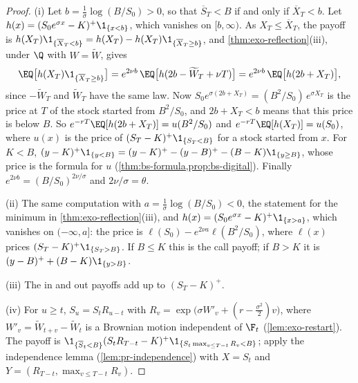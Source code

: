 \begin{proof}
(i) Let $b=\frac1\sigma\log(B/S_0)>0$, so that $\overline S_T<B$ if and only if
$\overline X_T<b$. Let $h(x)=(S_0e^{\sigma x}-K)^+\1_{\{x<b\}}$, which vanishes on $[b,\infty)$. As
$X_T\le\overline X_T$, the payoff is $h(X_T)\1_{\{\overline X_T<b\}}=h(X_T)-h(X_T)\1_{\{\overline X_T\ge b\}}$,
and \cref{thm:exo-reflection}(iii), under $\Q$ with $W=\widetilde W$, gives
\[
  \EQ\big[h(X_T)\1_{\{\overline X_T\ge b\}}\big]=e^{2\nu b}\,\EQ\big[h(2b-\widetilde W_T+\nu T)\big]
  =e^{2\nu b}\,\EQ\big[h(2b+X_T)\big],
\]
since $-\widetilde W_T$ and $\widetilde W_T$ have the same law. Now
$S_0e^{\sigma(2b+X_T)}=(B^2/S_0)\,e^{\sigma X_T}$ is the price at $T$ of the stock started from
$B^2/S_0$, and $2b+X_T<b$ means that this price is below $B$. So
$e^{-rT}\EQ[h(2b+X_T)]=u(B^2/S_0)$ and $e^{-rT}\EQ[h(X_T)]=u(S_0)$, where $u(x)$ is the price of
$(S_T-K)^+\1_{\{S_T<B\}}$ for a stock started from $x$. For $K<B$,
$(y-K)^+\1_{\{y<B\}}=(y-K)^+-(y-B)^+-(B-K)\1_{\{y\ge B\}}$, whose price is the formula for $u$
(\cref{thm:bs-formula,prop:bs-digital}). Finally $e^{2\nu b}=(B/S_0)^{2\nu/\sigma}$ and
$2\nu/\sigma=\theta$.

(ii) The same computation with $a=\frac1\sigma\log(B/S_0)<0$, the statement for the minimum in
\cref{thm:exo-reflection}(iii), and $h(x)=(S_0e^{\sigma x}-K)^+\1_{\{x>a\}}$, which vanishes on
$(-\infty,a]$: the price is $\ell(S_0)-e^{2\nu a}\ell(B^2/S_0)$, where $\ell(x)$ prices
$(S_T-K)^+\1_{\{S_T>B\}}$. If $B\le K$ this is the call payoff; if $B>K$ it is
$(y-B)^+ +(B-K)\1_{\{y>B\}}$.

(iii) The in and out payoffs add up to $(S_T-K)^+$.

(iv) For $u\ge t$, $S_u=S_tR_{u-t}$ with $R_v=\exp\big(\sigma W'_v+(r-\frac{\sigma^2}2)v\big)$, where
$W'_v=\widetilde W_{t+v}-\widetilde W_t$ is a Brownian motion independent of $\F_t$
(\cref{lem:exo-restart}). The payoff is
$\1_{\{\overline S_t<B\}}(S_tR_{T-t}-K)^+\1_{\{S_t\max_{v\le T-t}R_v<B\}}$; apply the independence
lemma (\cref{lem:pr-independence}) with $X=S_t$ and $Y=(R_{T-t},\max_{v\le T-t}R_v)$.
\end{proof}


